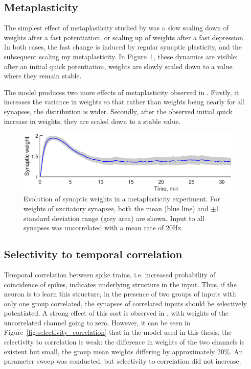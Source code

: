 \documentclass[a4paper,12pt]{report}
\theoremstyle{definition}
\begin{document}
\subsection{Metaplasticity}

The simplest effect of metaplasticity studied by \cite{yeung2004synaptic} was a slow scaling down of weights after a fast potentiation, or scaling up of weights after a fast depression. In both cases, the fast change is induced by regular synaptic plasticity, and the subsequent scaling my metaplasticity. In Figure~\ref{fig:valid_metaplasticity_evolution}, these dynamics are visible: after an initial quick potentiation, weights are slowly scaled down to a value where they remain stable.

The model produces two more effects of metaplasticity observed in \cite{yeung2004synaptic}. Firstly, it increases the variance in weights so that rather than weights being nearly for all synapses, the distribution is wider. Secondly, after the observed initial quick increase in weights, they are scaled down to a stable value.

\begin{figure}[h]
    \includegraphics[width=\textwidth]{figures/valid_metaplasticity_evolution.eps}
    \caption{Evolution of synaptic weights in a metaplasticity experiment. For weights of excitatory synapses, both the mean (blue line) and $\pm$1 standard deviation range (grey area) are shown. Input to all synapses was uncorrelated with a mean rate of 20Hz.}
    \label{fig:valid_metaplasticity_evolution}
\end{figure}




\subsection{Selectivity to temporal correlation} %
\label{subsec:selectivitycorrelation}

Temporal correlation between spike trains, i.e. increased probability of coincidence of spikes, indicates underlying structure in the input. Thus, if the neuron is to learn this structure, in the presence of two groups of inputs with only one group correlated, the synapses of correlated inputs should be selectively potentiated. A strong effect of this sort is observed in \cite{yeung2004synaptic}, with weights of the uncorrelated channel going to zero. However, it can be seen in Figure~\ref{fig:selectivity_correlation} that in the model used in this thesis, the selectivity to correlation is weak: the difference in weights of the two channels is existent but small, the group mean weights differing by approximately 20\%. An parameter sweep was conducted, but selectivity to correlation did not increase.
\end{document}
